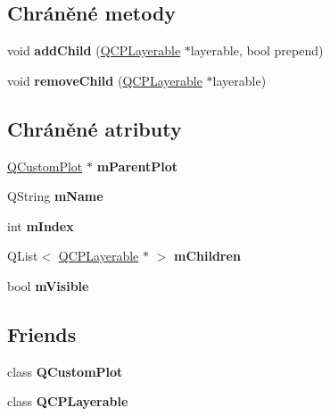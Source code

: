 \subsection*{Chráněné metody}
\begin{DoxyCompactItemize}
\item 
\hypertarget{classQCPLayer_a57ce5e49364aa9122276d5df3b4a0ddc}{}void {\bfseries add\+Child} (\hyperlink{classQCPLayerable}{Q\+C\+P\+Layerable} $\ast$layerable, bool prepend)\label{classQCPLayer_a57ce5e49364aa9122276d5df3b4a0ddc}

\item 
\hypertarget{classQCPLayer_ac2f64ac7761650582d968d86670ef362}{}void {\bfseries remove\+Child} (\hyperlink{classQCPLayerable}{Q\+C\+P\+Layerable} $\ast$layerable)\label{classQCPLayer_ac2f64ac7761650582d968d86670ef362}

\end{DoxyCompactItemize}
\subsection*{Chráněné atributy}
\begin{DoxyCompactItemize}
\item 
\hypertarget{classQCPLayer_a2f3374a7884bf403720cd1cf6f7ad1bb}{}\hyperlink{classQCustomPlot}{Q\+Custom\+Plot} $\ast$ {\bfseries m\+Parent\+Plot}\label{classQCPLayer_a2f3374a7884bf403720cd1cf6f7ad1bb}

\item 
\hypertarget{classQCPLayer_a91e6298183cb4b9dfd4efdfaf1ecc220}{}Q\+String {\bfseries m\+Name}\label{classQCPLayer_a91e6298183cb4b9dfd4efdfaf1ecc220}

\item 
\hypertarget{classQCPLayer_a122088bcab6cec76a52b75ce8606605b}{}int {\bfseries m\+Index}\label{classQCPLayer_a122088bcab6cec76a52b75ce8606605b}

\item 
\hypertarget{classQCPLayer_a704aa71bba469383c3a3c598c1ec0d28}{}Q\+List$<$ \hyperlink{classQCPLayerable}{Q\+C\+P\+Layerable} $\ast$ $>$ {\bfseries m\+Children}\label{classQCPLayer_a704aa71bba469383c3a3c598c1ec0d28}

\item 
\hypertarget{classQCPLayer_a264950deb08e589460c126c895a1e2b5}{}bool {\bfseries m\+Visible}\label{classQCPLayer_a264950deb08e589460c126c895a1e2b5}

\end{DoxyCompactItemize}
\subsection*{Friends}
\begin{DoxyCompactItemize}
\item 
\hypertarget{classQCPLayer_a1cdf9df76adcfae45261690aa0ca2198}{}class {\bfseries Q\+Custom\+Plot}\label{classQCPLayer_a1cdf9df76adcfae45261690aa0ca2198}

\item 
\hypertarget{classQCPLayer_ad655f55cccf49ba14d5172ec517e07ae}{}class {\bfseries Q\+C\+P\+Layerable}\label{classQCPLayer_ad655f55cccf49ba14d5172ec517e07ae}

\end{DoxyCompactItemize}


